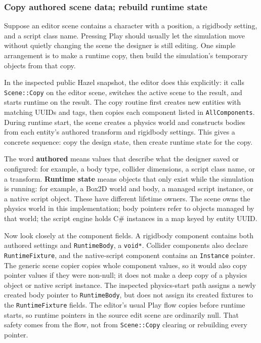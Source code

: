 \subsubsection{Copy authored scene data; rebuild runtime state}\label{06-engine-ii-ch032-copy-authored-scene-data-rebuild-runtime-state}

\hypertarget{06-engine-ii-ch032-copy-authored-scene-data-rebuild-runtime-state}{}

Suppose an editor scene contains a character with a position, a rigidbody setting, and a script class name. Pressing Play should usually let the simulation move without quietly changing the scene the designer is still editing. One simple arrangement is to make a runtime copy, then build the simulation's temporary objects from that copy.

In the inspected public Hazel snapshot, the editor does this explicitly: it calls \texttt{Scene::Copy} on the editor scene, switches the active scene to the result, and starts runtime on the result. The copy routine first creates new entities with matching UUIDs and tags, then copies each component listed in \texttt{AllComponents}. During runtime start, the scene creates a physics world and constructs bodies from each entity's authored transform and rigidbody settings. This gives a concrete sequence: copy the design state, then create runtime state for the copy.

The word \textbf{authored} means values that describe what the designer saved or configured: for example, a body type, collider dimensions, a script class name, or a transform. \textbf{Runtime state} means objects that only exist while the simulation is running: for example, a Box2D world and body, a managed script instance, or a native script object. These have different lifetime owners. The scene owns the physics world in this implementation; body pointers refer to objects managed by that world; the script engine holds C\# instances in a map keyed by entity UUID.

Now look closely at the component fields. A rigidbody component contains both authored settings and \texttt{RuntimeBody}, a \texttt{void*}. Collider components also declare \texttt{RuntimeFixture}, and the native-script component contains an \texttt{Instance} pointer. The generic scene copier copies whole component values, so it would also copy pointer values if they were non-null; it does not make a deep copy of a physics object or native script instance. The inspected physics-start path assigns a newly created body pointer to \texttt{RuntimeBody}, but does not assign its created fixtures to the \texttt{RuntimeFixture} fields. The editor's usual Play flow copies before runtime starts, so runtime pointers in the source edit scene are ordinarily null. That safety comes from the flow, not from \texttt{Scene::Copy} clearing or rebuilding every pointer.

